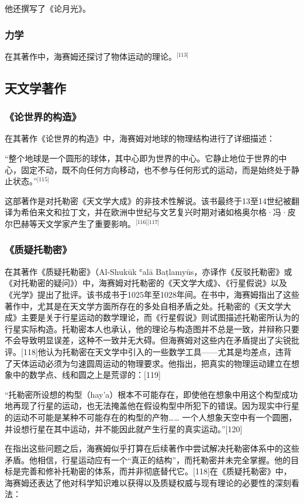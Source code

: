 他还撰写了《论月光》。
\subsubsection{力学}
在其著作中，海赛姆还探讨了物体运动的理论。\(^\text{[113]}\)
\subsection{天文学著作}
\subsubsection{《论世界的构造》}
在其著作《论世界的构造》中，海赛姆对地球的物理结构进行了详细描述：

“整个地球是一个圆形的球体，其中心即为世界的中心。它静止地位于世界的中心，固定不动，既不向任何方向移动，也不参与任何形式的运动，而是始终处于静止状态。”\(^\text{[115]}\)

这部著作是对托勒密《天文学大成》的非技术性解说。该书最终于13至14世纪被翻译为希伯来文和拉丁文，并在欧洲中世纪与文艺复兴时期对诸如格奥尔格·冯·皮尔巴赫等天文学家产生了重要影响。\(^\text{[116][117]}\)
\subsubsection{《质疑托勒密》}
在其著作《质疑托勒密》（Al-Shukūk ʿalā Baṭlamyūs，亦译作《反驳托勒密》或《对托勒密的疑问》）中，海赛姆对托勒密的《天文学大成》、《行星假说》以及《光学》提出了批评。该书成书于1025年至1028年间。在书中，海赛姆指出了这些著作中，尤其是在天文学方面所存在的多处自相矛盾之处。托勒密的《天文学大成》主要是关于行星运动的数学理论，而《行星假说》则试图描述托勒密所认为的行星实际构造。托勒密本人也承认，他的理论与构造图并不总是一致，并辩称只要不会导致明显误差，这种不一致并无大碍。但海赛姆对这些内在矛盾提出了尖锐批评。[118]他认为托勒密在天文学中引入的一些数学工具——尤其是均差点，违背了天体运动必须为匀速圆周运动的物理要求。他指出，把真实的物理运动建立在想象中的数学点、线和圆之上是荒谬的：[119]

“托勒密所设想的构型（hay’a）根本不可能存在，即使他在想象中用这个构型成功地再现了行星的运动，也无法掩盖他在假设构型中所犯下的错误。因为现实中行星的运动不可能是某种不可能存在的构型的产物……
一个人想象天空中有一个圆圈，并设想行星在其中运动，并不能因此就产生行星的真实运动。”[120]

在指出这些问题之后，海赛姆似乎打算在后续著作中尝试解决托勒密体系中的这些矛盾。他相信，行星运动应有一个“真正的结构”，而托勒密并未完全掌握。他的目标是完善和修补托勒密的体系，而并非彻底替代它。[118]在《质疑托勒密》中，海赛姆还表达了他对科学知识难以获得以及质疑权威与现有理论的必要性的深刻看法：

